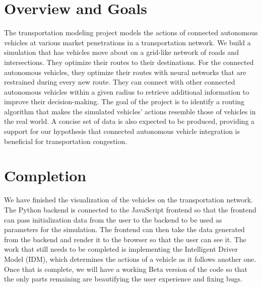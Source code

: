 \documentclass[onecolumn, draftclsnofoot,10pt, compsoc]{IEEEtran}
\begin{document}
\section{Overview and Goals}
The transportation modeling project models the actions of connected autonomous vehicles at various market penetrations in a transportation network. We build a simulation that has vehicles move about on a grid-like network of roads and intersections. They optimize their routes to their destinations. For the connected autonomous vehicles, they optimize their routes with neural networks that are restrained during every new route. They can connect with other connected autonomous vehicles within a given radius to retrieve additional information to improve their decision-making. The goal of the project is to identify a routing algorithm that makes the simulated vehicles’ actions resemble those of vehicles in the real world. A concise set of data is also expected to be produced, providing a support for our hypothesis that connected autonomous vehicle integration is beneficial for transportation congestion.
\section{Completion}
We have finished the visualization of the vehicles on the transportation network. The Python backend is connected to the JavaScript frontend so that the frontend can pass initialization data from the user to the backend to be used as parameters for the simulation. The frontend can then take the data generated from the backend and render it to the browser so that the user can see it. The work that still needs to be completed is implementing the Intelligent Driver Model (IDM), which determines the actions of a vehicle as it follows another one. Once that is complete, we will have a working Beta version of the code so that the only parts remaining are beautifying the user experience and fixing bugs.
\end{document}
